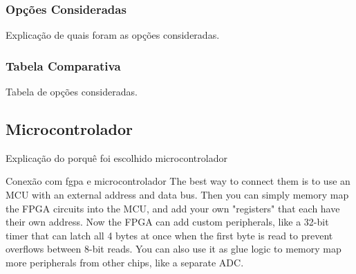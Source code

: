 	
	\subsubsection{Opções Consideradas}\label{fpga-options}
	
	Explicação de quais foram as opções consideradas.
	
	\subsubsection{Tabela Comparativa}\label{fpga-table}
	
	Tabela de opções consideradas.
	
	\subsection{Microcontrolador}\label{hard-uc}
	
	Explicação do porquê foi escolhido microcontrolador
	
	Conexão com fgpa e microcontrolador
	The best way to connect them is to use an MCU with an external address and data bus. Then you can simply memory map the FPGA circuits into the MCU, and add your own "registers" that each have their own address. Now the FPGA can add custom peripherals, like a 32-bit timer that can latch all 4 bytes at once when the first byte is read to prevent overflows between 8-bit reads. You can also use it as glue logic to memory map more peripherals from other chips, like a separate ADC.
	
